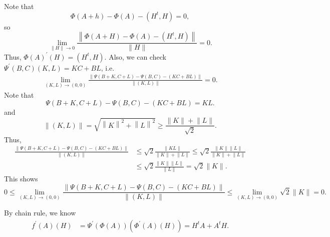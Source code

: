 \begin{explanation}
\begin{description}
Note that 
\[
    \Phi (A + h) - \Phi (A) - \left( H^t, H \right) = 0, 
\]
so 
\[
    \lim_{\lVert H \rVert  \to 0} \frac{\left\lVert \Phi (A + H) - \Phi (A) - \left( H^t, H \right)  \right\rVert }{\lVert H \rVert } = 0. 
\]
Thus, \(\Phi (A)^{\prime} (H) = \left( H^t, H \right) \). Also, we can check \(\Psi ^{\prime} (B, C)(K, L) = KC + BL\), i.e.
\begin{align*}
   \lim_{(K, L) \to (0, 0)} \frac{\left\lVert \Psi (B + K, C + L) - \Psi (B, C) - (KC + BL) \right\rVert }{\lVert (K, L) \rVert } = 0.  
\end{align*}
Note that 
\[
    \Psi (B + K, C + L) - \Psi (B, C) - (KC + BL)= KL.
\]
and
\[
    \left\lVert (K, L) \right\rVert = \sqrt{\left\lVert K \right\rVert^2 + \left\lVert L \right\rVert^2  } \ge \frac{\lVert K \rVert + \lVert L \rVert  }{\sqrt{2} }.  
\]
Thus, 
\begin{align*}
   \frac{\left\lVert \Psi (B + K, C + L) - \Psi (B, C) - (KC + BL) \right\rVert }{\lVert (K, L) \rVert } &\le \sqrt{2} \frac{\lVert KL \rVert }{\lVert K \rVert + \lVert L \rVert  } \le \sqrt{2} \frac{\lVert K \rVert \lVert L \rVert  }{\lVert K \rVert + \lVert L \rVert  } \\
   &\le \sqrt{2} \frac{\lVert K \rVert \lVert L \rVert  }{\lVert L \rVert } = \sqrt{2} \lVert K \rVert.   
\end{align*}
This shows 
\[
   0 \le \lim_{(K, L) \to (0, 0)} \frac{\left\lVert \Psi (B + K, C + L) - \Psi (B, C) - (KC + BL) \right\rVert }{\lVert (K, L) \rVert } \le \lim_{(K, L) \to (0, 0)} \sqrt{2} \lVert K \rVert  = 0. 
\]

By chain rule, we know 
\begin{align*}
    f^{\prime} (A)(H) &= \Psi ^{\prime} (\Phi (A)) \left( \Phi ^{\prime} (A)(H) \right) = H^t A + A^t H. 
\end{align*}  
    \end{description}
    

\end{explanation}